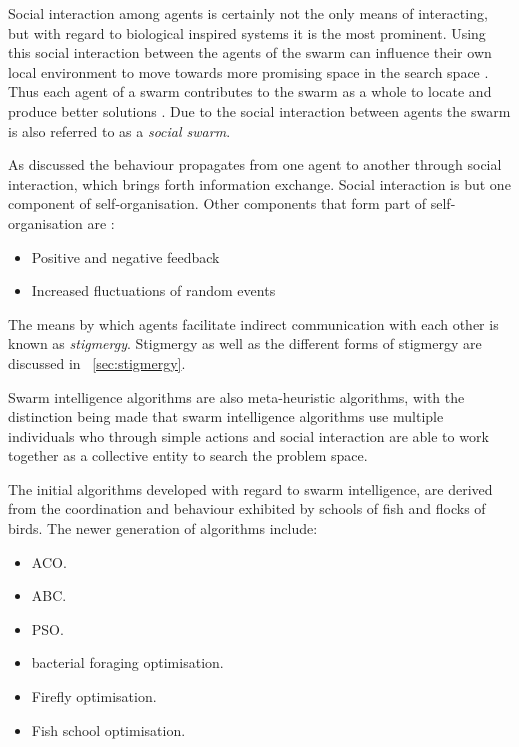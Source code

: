 Social interaction among agents is certainly not the only means of interacting, but with regard to biological inspired systems it is the most prominent\cite{CompuIntelligenceIntro}.
Using this social interaction between the agents of the swarm can influence their own local environment to move towards more promising space in the search space \cite{ChaoticSwarmIntel,CompuIntelligenceIntro}. Thus each agent of a swarm contributes to the swarm as a whole to locate and produce better solutions \cite{BeeJobShop}. Due to the social interaction between agents the swarm is also referred to as a \emph{social swarm}\cite{ChaoticSwarmIntel,FundamentalSwarm}.

As discussed the behaviour propagates from one agent to another through social interaction, which brings forth information exchange\cite{SwarmArt}. Social interaction is but one component of self-organisation. Other components that form part of self-organisation are \cite{SIPowerInNums}:
\begin{itemize}
\item Positive and negative feedback\cite{SIPowerInNums}
\item Increased fluctuations of random events\cite{SIPowerInNums}
\end{itemize}

The means by which agents facilitate indirect communication with each other is known as \emph{stigmergy}. Stigmergy as well as the different forms of stigmergy are discussed in ~\ref{sec:stigmergy}.

Swarm intelligence algorithms are also meta-heuristic algorithms, with the distinction being made that swarm intelligence algorithms use multiple individuals who through simple actions and social interaction are able to work together as a collective entity to search the problem space\cite{SwarmArt,ChaoticSwarmIntel,BeeJobShop,CompuIntelligenceIntro,FundamentalSwarm}.

The initial algorithms developed with regard to swarm intelligence,  are derived from the coordination and behaviour exhibited by schools of fish and flocks of birds. The newer generation of algorithms include\cite{SwarmArt,ChaoticSwarmIntel,BeeJobShop}:
\begin{itemize}
\item \gls{ACO}\cite{SwarmArt}.
\item \gls{ABC}\cite{BeeJobShop}.
\item \gls{PSO}\cite{ChaoticSwarmIntel}. 
\item bacterial foraging optimisation\cite{CompuIntelligenceIntro}.
\item Firefly optimisation\cite{CompuIntelligenceIntro}.
\item Fish school optimisation\cite{CompuIntelligenceIntro}.
\end{itemize}


